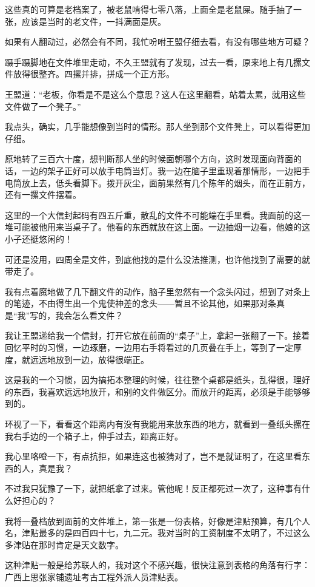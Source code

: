 这些真的可算是老档案了，被老鼠啃得七零八落，上面全是老鼠屎。随手抽了一张，应该是当时的老文件，一抖满面是灰。

如果有人翻动过，必然会有不同，我忙吩咐王盟仔细去看，有没有哪些地方可疑？

蹑手蹑脚地在文件堆里走动，不久王盟就有了发现，过去一看，原来地上有几摞文件放得很整齐。四摞并排，拼成一个正方形。

王盟道：“老板，你看是不是这么个意思？这人在这里翻看，站着太累，就用这些文件做了一个凳子。”

我点头，确实，几乎能想像到当时的情形。那人坐到那个文件凳上，可以看得更加仔细。

原地转了三百六十度，想判断那人坐的时候面朝哪个方向，这时发现面向背面的话，一边的架子正好可以放手电筒当灯。我一边在脑子里重现着那情形，一边把手电筒放上去，低头看脚下。拨开灰尘，面前果然有几个陈年的烟头，而在正前方，还有一摞文件摆着。

这里的一个大信封起码有四五斤重，散乱的文件不可能端在手里看。我面前的这一堆可能被他用来当桌子了。他看的东西就放在这上面。一边抽烟一边看，他娘的这小子还挺悠闲的！

可还是没用，四周全是文件，到底他找的是什么没法推测，也许他找到了需要的就带走了。

我有点着魔地做了几下翻文件的动作，脑子里忽然有一个念头闪过，想到了对条上的笔迹，不由得生出一个鬼使神差的念头——暂且不论其他，如果那对条真是“我”写的，我会怎么看文件？

我让王盟递给我一个信封，打开它放在前面的“桌子”上，拿起一张翻了一下。接着回忆平时的习惯，一边琢磨，一边用右手将看过的几页叠在手上，等到了一定厚度，就远远地放到一边，放得很端正。

这是我的一个习惯，因为搞拓本整理的时候，往往整个桌都是纸头，乱得很，理好的东西，我喜欢远远地放开，和别的文件做区分。而放开的距离，必须是手能够够到的。

环视了一下，看看这个距离内有没有我能用来放东西的地方，就看到一叠纸头摞在我右手边的一个箱子上，伸手过去，距离正好。

我心里咯噔一下，有点抗拒，如果连这也被猜对了，岂不是就证明了，在这里看东西的人，真是我？

不过我只犹豫了一下，就把纸拿了过来。管他呢！反正都死过一次了，这种事有什么好担心的？

我将一叠档放到面前的文件堆上，第一张是一份表格，好像是津贴预算，有几个人名，津贴最多的是四百四十七，九二元。我对当时的工资制度不太明了，不过这么多津贴在那时肯定是天文数字。

这种津贴一般是给苏联人的，我对这个不感兴趣，很快注意到表格的角落有行字：广西上思张家铺遗址考古工程外派人员津贴表。

